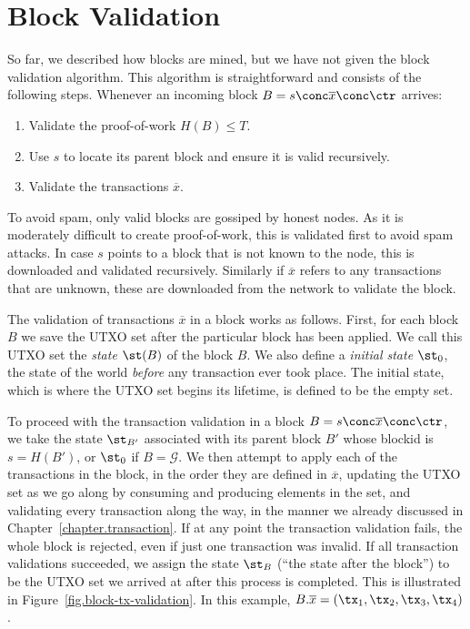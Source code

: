 \section{Block Validation}

So far, we described how blocks are mined, but we have not given the block validation algorithm.
This algorithm is straightforward and consists of the following steps. Whenever an incoming
block $B = s \conc \overline{x} \conc \ctr$ arrives:

\begin{enumerate}
    \item Validate the proof-of-work $H(B) \leq T$.
    \item Use $s$ to locate its parent block and ensure it is valid recursively.
    \item Validate the transactions $\overline{x}$.
\end{enumerate}

To avoid spam, only valid blocks are gossiped by honest nodes. As it is moderately difficult to
create proof-of-work, this is validated first to avoid spam attacks. In case $s$ points to a block
that is not known to the node, this is downloaded and validated recursively. Similarly if
$\overline{x}$ refers to any transactions that are unknown, these are downloaded from the network
to validate the block.

The validation of transactions
$\overline{x}$ in a block works as follows.
First, for each block $B$ we save the UTXO set after the particular block has been applied.
We call this UTXO set the \emph{state} $\st(B)$ of the block $B$.
We also define a \emph{initial state} $\st_0$, the state of the world \emph{before}
any transaction ever
took place. The initial state, which is where the UTXO set begins its lifetime, is defined to be the
empty set.

To proceed with the transaction validation in a block $B = s \conc \overline{x} \conc \ctr$, we take the state
$\st_{B'}$ associated with
its parent block $B'$ whose blockid is $s = H(B')$, or $\st_0$ if $B = \mathcal{G}$.
We then attempt to apply each of the transactions in the block, in the order
they are defined in $\overline{x}$, updating the UTXO set as we go along by consuming
and producing elements in the set, and validating
every transaction along the way, in the manner we already discussed in Chapter~\ref{chapter.transaction}.
If at any point the transaction validation fails, the whole block is rejected,
even if just one transaction was invalid. If all transaction validations succeeded,
we assign the state $\st_B$ (``the state after the block'') to be the UTXO set we arrived at after
this process is completed. This is illustrated in Figure~\ref{fig.block-tx-validation}.
In this example, $B.\overline{x} = (\tx_1, \tx_2, \tx_3, \tx_4)$.

